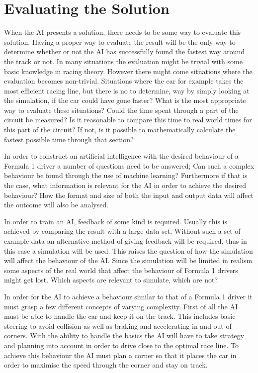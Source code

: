 \section{Evaluating the Solution}
When the AI presents a solution, there needs to be some way to evaluate this solution. Having a proper way to evaluate the result will be the only way to determine whether or not the AI has successfully found the fastest way around the track or not. In many situations the evaluation might be trivial with some basic knowledge in racing theory. However there might come situations where the evaluation becomes non-trivial. Situations where the car for example takes the most efficient racing line, but there is no to determine, way by simply looking at the simulation, if the car could have gone faster? What is the most appropriate way to evaluate these situations? Could the time spent through a part of the circuit be measured? Is it reasonable to compare this time to real world times for this part of the circuit? If not, is it possible to mathematically calculate the fastest possible time through that section?

\iffalse
In order to construct an artificial intelligence with the desired behaviour of a Formula 1 driver a number of questions need to be answered; Can such a complex behaviour be found through the use of machine learning? Furthermore if that is the case, what information is relevant for the AI in order to achieve the desired behaviour? How the format and size of both the input and output data will affect the outcome will also be analysed.

In order to train an AI, feedback of some kind is required. Usually this is achieved by comparing the result with a large data set. Without such a set of example data an alternative method of giving feedback will be required, thus in this case a simulation will be used. This raises the question of how the simulation will affect the behaviour of the AI. Since the simulation will be limited in realism some aspects of the real world that affect the behaviour of Formula 1 drivers might get lost. Which aspects are relevant to simulate, which are not?

In order for the AI to achieve a behaviour similar to that of a Formula 1 driver it must grasp a few different concepts of varying complexity. First of all the AI must be able to handle the car and keep it on the track. This includes basic steering to avoid collision as well as braking and accelerating in and out of corners. With the ability to handle the basics the AI will have to take strategy and planning into account in order to drive close to the optimal race line. To achieve this behaviour the AI must plan a corner so that it places the car in order to maximise the speed through the corner and stay on track.

